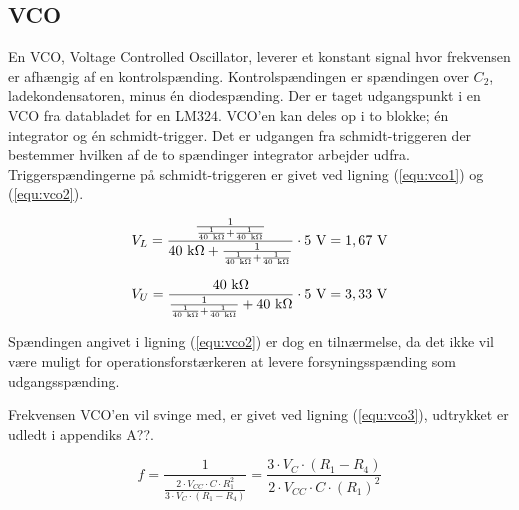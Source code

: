 \subsection*{VCO}
\label{volumenkontrol-design-vco}

En VCO, Voltage Controlled Oscillator, leverer et konstant signal hvor frekvensen er afhængig af en kontrolspænding. Kontrolspændingen er spændingen over $C_2$, ladekondensatoren, minus én diodespænding. Der er taget udgangspunkt i en VCO fra databladet for en LM324. VCO'en kan deles op i to blokke; én integrator og én schmidt-trigger. Det er udgangen fra schmidt-triggeren der bestemmer hvilken af de to spændinger integrator arbejder udfra. Triggerspændingerne på schmidt-triggeren er givet ved ligning (\ref{equ:vco1}) og (\ref{equ:vco2}). 

\begin{equation}
\label{equ:vco1}
V_L = \mathrm{\frac{\frac{1}{\frac{1}{40~k\ohm} + \frac{1}{40~k\ohm}}}{40~k\ohm + \frac{1}{\frac{1}{40~k\ohm} + \frac{1}{40~k\ohm}}} \cdot 5~V = 1,67~V}
\end{equation}

\begin{equation}
\label{equ:vco2}
V_U = \mathrm{\frac{40~k\ohm}{\frac{1}{\frac{1}{40~k\ohm} + \frac{1}{40~k\ohm}} + 40~k\ohm} \cdot 5~V = 3,33~V}
\end{equation}

Spændingen angivet i ligning (\ref{equ:vco2}) er dog en tilnærmelse, da det ikke vil være muligt for operationsforstærkeren at levere forsyningsspænding som udgangsspænding.

Frekvensen VCO'en vil svinge med, er givet ved ligning (\ref{equ:vco3}), udtrykket er udledt i appendiks A??.

\begin{equation}
\label{equ:vco3}
f = \frac{1}{\frac{2 \cdot V_{CC} \cdot C \cdot R_1^2}{3 \cdot V_C \cdot (R_1 - R_4)}} = \frac{3 \cdot V_C \cdot (R_1 - R_4)}{2 \cdot V_{CC} \cdot C \cdot (R_1)^2}
\end{equation}


